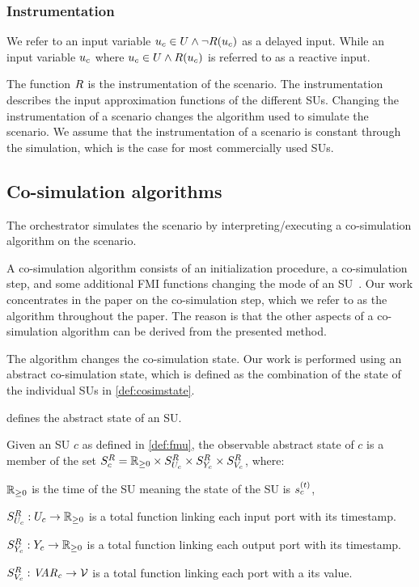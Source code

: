 \subsubsection{Instrumentation}
We refer to an input variable $u_{c} \in U \land \neg R(u_{c})$ as a delayed input. 
While an input variable $u_{c}$ where $u_{c} \in U \land R(u_{c})$ is referred to as a reactive input. 

The function $R$ is the instrumentation of the scenario.
The instrumentation describes the input approximation functions of the different SUs.
Changing the instrumentation of a scenario changes the algorithm used to simulate the scenario.
We assume that the instrumentation of a scenario is constant through the simulation, which is the case for most commercially used SUs.

\subsection{Co-simulation algorithms}\label{sc:cosimalgo}
The orchestrator simulates the scenario by interpreting/executing a co-simulation algorithm on the scenario.

A co-simulation algorithm consists of an initialization procedure, a co-simulation step, and some additional FMI functions changing the mode of an SU~\cite{FMI2014}.
Our work concentrates in the paper on the co-simulation step, which we refer to as the algorithm throughout the paper. 
The reason is that the other aspects of a co-simulation algorithm can be derived from the presented method.  

The algorithm changes the co-simulation state. 
Our work is performed using an abstract co-simulation state, which is defined as the combination of the state of the individual SUs in \cref{def:cosimstate}.

 defines the abstract state of an SU.

\begin{definition}\label{def:runtime_state}
  Given an SU $c$ as defined in \cref{def:fmu}, the observable abstract state of $c$ is a member of the set $S^{R}_{c} = \mathbb{R}_{\geq 0} \times S^{R}_{U_{c}} \times S^{R}_{Y_{c}} \times S^{R}_{V_c}$, where:
  \begin{compactitem}
    \item $\mathbb{R}_{\geq 0}$ is the time of the SU meaning the state of the SU is $s_{c}^{(t)}$,
    \item $S^{R}_{U_{c}} : U_{c} \to \mathbb{R}_{\geq 0}$ is a total function linking each input port with its timestamp.  
    \item $S^{R}_{Y_{c}} : Y_{c} \to \mathbb{R}_{\geq 0}$ is a total function linking each output port with its timestamp.  
    \item $S^{R}_{V_c} : \mathit{VAR_{c}} \to \mathcal{V}$ is a total function linking each port with a its value.  
  \end{compactitem}
\end{definition}

